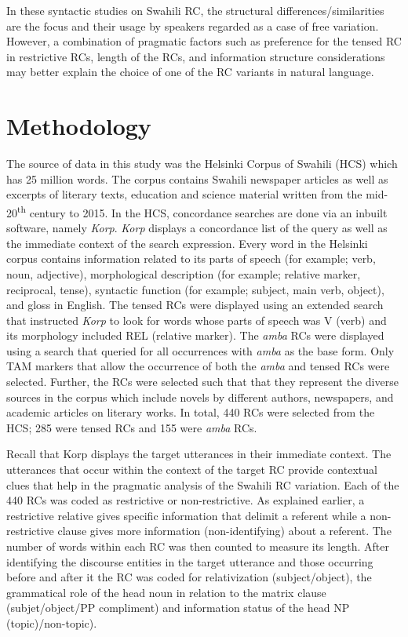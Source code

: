 \documentclass[output=paper,colorlinks,citecolor=brown]{langscibook}
\begin{document}
In these syntactic studies on Swahili RC, the structural differences/similarities are the focus and their usage by speakers regarded as a case of free variation. However, a combination of pragmatic factors such as preference for the tensed RC in restrictive RCs, length of the RCs, and information structure considerations may better explain the choice of one of the RC variants in natural language.

\section{Methodology}\label{sec:mwamzandi:3}

The source of data in this study was the Helsinki Corpus of Swahili (HCS) which has 25 million words. The corpus contains Swahili newspaper articles as well as excerpts of literary texts, education and science material written from the mid-20\textsuperscript{th} century to 2015. In the HCS, concordance searches are done via an inbuilt software, namely \textit{Korp}. \textit{Korp} displays a concordance list of the query as well as the immediate context of the search expression. Every word in the Helsinki corpus contains information related to its parts of speech (for example; verb, noun, adjective), morphological description (for example; relative marker, reciprocal, tense), syntactic function (for example; subject, main verb, object), and gloss in English. The tensed RCs were displayed using an extended search that instructed \textit{Korp} to look for words whose parts of speech was V (verb) and its morphology included REL (relative marker). The \textit{amba} RCs were displayed using a search that queried for all occurrences with \textit{amba} as the base form. Only TAM markers that allow the occurrence of both the \textit{amba} and tensed RCs were selected. Further, the RCs were selected such that that they represent the diverse sources in the corpus which include novels by different authors, newspapers, and academic articles on literary works. In total, 440 RCs were selected from the HCS; 285 were tensed RCs and 155 were \textit{amba} RCs.

Recall that Korp displays the target utterances in their immediate context. The utterances that occur within the context of the target RC provide contextual clues that help in the pragmatic analysis of the Swahili RC variation. Each of the 440 RCs was coded as restrictive or non-restrictive. As explained earlier, a restrictive relative gives specific information that delimit a referent while a non-restrictive clause gives more information (non-identifying) about a referent. The number of words within each RC was then counted to measure its length. After identifying the discourse entities in the target utterance and those occurring before and after it the RC was coded for relativization (subject/object), the grammatical role of the head noun in relation to the matrix clause (subjet/object/PP compliment) and information status of the head NP (topic)/non-topic).
\end{document}
